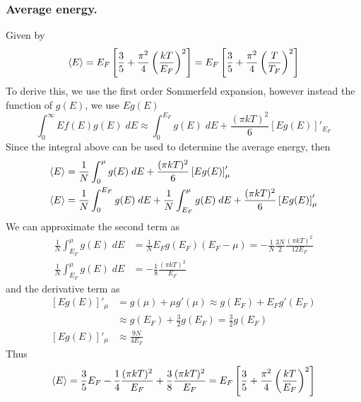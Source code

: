 \documentclass[../../../Main.tex]{subfiles}
\begin{document}
\subsubsection{Average energy.} Given by 
\begin{equation*}
    \braket{E}=E_F\left[\frac{3}{5}+\frac{\pi^2}{4}\left(\frac{kT}{E_F}\right)^2\right]= E_F\left[\frac{3}{5}+\frac{\pi^2}{4}\left(\frac{T}{T_F}\right)^2\right]
\end{equation*}
To derive this, we use the first order Sommerfeld expansion, however instead the function of $g(E)$, we use $Eg(E)$
\begin{equation*}
    \int_{0}^{\infty}E f(E) g(E) \;dE \approx \int_{0}^{E_F} g(E) \;dE +  \frac{(\pi kT)^2}{6}\left[Eg(E)\right]'_{E_F}
\end{equation*}
Since the integral above can be used to determine the average energy, then 
\begin{align*}
    \braket{E}&=\frac{1}{N}\int_{0}^{\mu}g(E) \;dE+ \frac{(\pi kT)^2}{6}\left[Eg(E)\right]'_{\mu}\\
    \braket{E}&=\frac{1}{N}\int_{0}^{E_F}g(E) \;dE+ \frac{1}{N}\int_{E_F}^{\mu}g(E)\; dE+ \frac{(\pi kT)^2}{6}\left[Eg(E)\right]'_{\mu}
\end{align*}
We can approximate the second term as 
\begin{align*}
    \frac{1}{N}\int_{E_F}^{\mu}g(E) \;dE&=\frac{1}{N}E_Fg(E_F)(E_F-\mu) =-\frac{1}{N}\frac{3N}{2}\frac{(\pi kT)^2}{12E_F}\\
    \frac{1}{N}\int_{E_F}^{\mu}g(E) \;dE&=-\frac{1}{8}\frac{(\pi kT)^2}{E_F}
\end{align*}
and the derivative term as 
\begin{align*}
    \left[Eg(E)\right]'_{\mu}&=g(\mu)+\mu g'(\mu)\approx g(E_F)+E_Fg'(E_F)\\
    &\approx g(E_F)+\frac{3}{2}g(E_F)=\frac{3}{2}g(E_F)\\
    \left[Eg(E)\right]'_{\mu}&\approx\frac{9N}{4E_F}
\end{align*}
Thus 
\begin{align*}
    \braket{E}=\frac{3}{5}E_F-\frac{1}{4}\frac{(\pi kT)^2}{E_F}+\frac{3}{8}\frac{(\pi kT)^2}{E_F}=E_F\left[\frac{3}{5}+\frac{\pi^2}{4}\left(\frac{kT}{E_F}\right)^2\right]
\end{align*}
\end{document}
